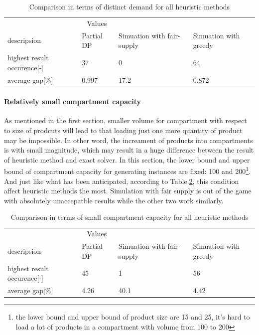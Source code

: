 \documentclass{article}
\begin{document}
\begin{table}[ht]
 \caption{Comparison in terms of distinct demand for all heuristic methods}
  \centering
  \begin{tabular}{llll}
    \toprule
    \multicolumn{3}{c}{Values}                   \\
    \cmidrule(r){2-3}
    descripsion   & Partial DP    & Simuation with fair-supply      & Simuation with greedy \\
    \midrule
    highest result occurence[-]	&	37 	&	0	&	64	\\
    average gap[\%]	&	0.997	&	17.2 	&	0.872 	\\
    \bottomrule
  \end{tabular}
  \label{tab:distinct demand for heu}
\end{table}

\paragraph{Relatively small compartment capacity}
As mentioned in the first section, smaller volume for compartment with respect to size of prodcuts will lead to that loading just one more quantity of product may be impossible. In other word, the increament of products into compartments is with small magnitude, which may result in a huge difference between the result of heuristic method and exact solver. In this section, the lower bound and upper bound of compartment capacity for generating instances are fixed: 100 and 200\footnote{the lower bound and upper bound of product size are 15 and 25, it's hard to load a lot of products in a compartment with volume from 100 to 200}. And just like what has been anticipated, according to Table.\ref{tab:small compartment capacity for heu}, this condition affect heuristic methods the most. Simulation with fair supply is out of the game with absolutely unaccepatble results while the other two work similarly.

\begin{table}[ht]
 \caption{Comparison in terms of small compartment capacity for all heuristic methods}
  \centering
  \begin{tabular}{llll}
    \toprule
    \multicolumn{3}{c}{Values}                   \\
    \cmidrule(r){2-3}
    descripsion   & Partial DP    & Simuation with fair-supply      & Simuation with greedy \\
    \midrule
    highest result occurence[-]	&	45 	&	1	&	56	\\
    average gap[\%]	&	4.26	&	40.1 	&	4.42 	\\
    \bottomrule
  \end{tabular}
  \label{tab:small compartment capacity for heu}
\end{table}
\end{document}
